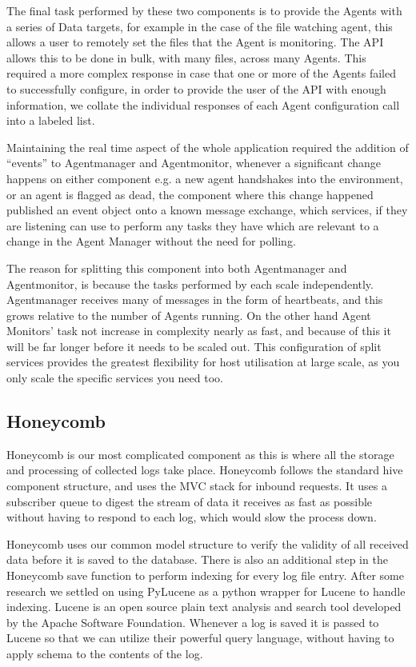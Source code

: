 The final task performed by these two components is to provide the Agents with
a series of Data targets, for example in the case of the file watching agent,
this allows a user to remotely set the files that the Agent is monitoring. The
API allows this to be done in bulk, with many files, across many Agents. This
required a more complex response in case that one or more of the Agents failed
to successfully configure, in order to provide the user of the API with enough
information, we collate the individual responses of each Agent configuration
call into a labeled list.

Maintaining the real time aspect of the whole application required the addition
of “events” to Agentmanager and Agentmonitor, whenever a significant change
happens on either component e.g. a new agent handshakes into the environment,
or an agent is flagged as dead, the component where this change happened
published an event object onto a known message exchange, which services, if
they are listening can use to perform any tasks they have which are relevant to
a change in the Agent Manager without the need for polling.

The reason for splitting this component into both Agentmanager and
Agentmonitor, is because the tasks performed by each scale independently.
Agentmanager receives many of messages in the form of heartbeats, and this
grows relative to the number of Agents running. On the other hand Agent
Monitors’ task not increase in complexity nearly as fast, and because of this
it will be far longer before it needs to be scaled out. This configuration of
split services provides the greatest flexibility for host utilisation at large
scale, as you only scale the specific services you need too.

\subsection{Honeycomb}

Honeycomb is our most complicated component as this is where all the storage
and processing of collected logs take place. Honeycomb follows the standard
hive component structure, and uses the MVC stack for inbound requests. It uses
a subscriber queue to digest the stream of data it receives as fast as possible
without having to respond to each log, which would slow the process down.

Honeycomb uses our common model structure to verify the validity of all
received data before it is saved to the database. There is also an additional
step in the Honeycomb save function to perform indexing for every log file
entry. After some research we settled on using PyLucene as a python wrapper for
Lucene to handle indexing. Lucene is an open source plain text analysis and
search tool developed by the Apache Software Foundation. Whenever a log is
saved it is passed to Lucene so that we can utilize their powerful query
language, without having to apply schema to the contents of the log.

